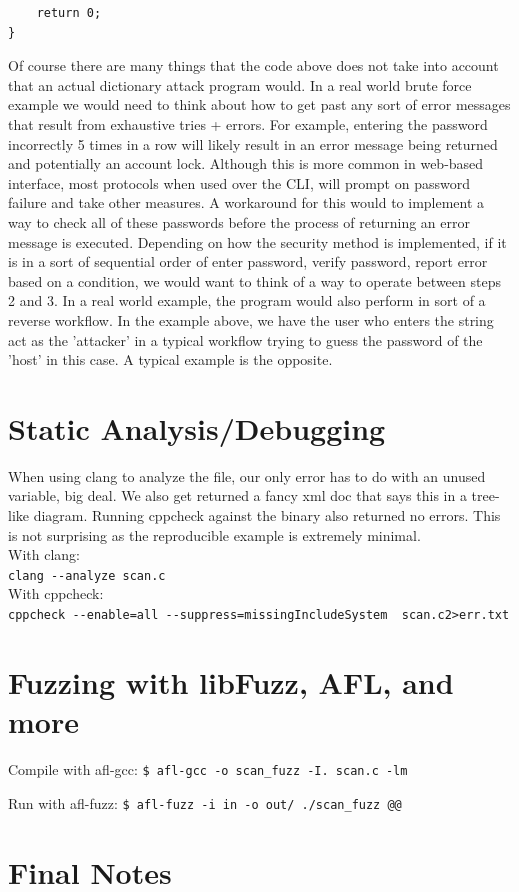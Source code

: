 \documentclass[12pt, letterpaper]{article}
\begin{document}
\begin{sloppypar}
\begin{flushleft}
\begin{lstlisting}
    return 0;
}
\end{lstlisting}
Of course there are many things that the code above does not take into account that an 
actual dictionary attack program would. In a real world brute force example we would need
to think about how to get past any sort of error messages that result from exhaustive 
tries + errors. For example, entering the password incorrectly 5 times in a row will likely 
result in an error message being returned and potentially an account lock. Although this is 
more common in web-based interface, most protocols when used over the CLI, will prompt on 
password failure and take other measures. A workaround for this would to implement a way to
check all of these passwords before the process of returning an error message is executed. 
Depending on how the security method is implemented, if it is in a sort of sequential order
of enter password, verify password, report error based on a condition, we would want to think
of a way to operate between steps 2 and 3. In a real world example, the program would also 
perform in sort of a reverse workflow. In the example above, we have the user who enters the
string act as the 'attacker' in a typical workflow trying to guess the password of the 
'host' in this case. A typical example is the opposite. 

\section*{Static Analysis/Debugging}
When using clang to analyze the file, our only error has to do with an unused variable, 
big deal. We also get returned a fancy xml doc that says this in a tree-like diagram. 
Running cppcheck against the binary also returned no errors. This is not surprising as the
reproducible example is extremely minimal. \\

With clang: \\
\verb|clang --analyze scan.c| \\

With cppcheck: \\
\verb|cppcheck --enable=all --suppress=missingIncludeSystem  scan.c2>err.txt | \\

\section*{Fuzzing with libFuzz, AFL, and more}

Compile with afl-gcc:
\verb|$ afl-gcc -o scan_fuzz -I. scan.c -lm|

Run with afl-fuzz:
\verb|$ afl-fuzz -i in -o out/ ./scan_fuzz @@ |

\section*{Final Notes}


\end{flushleft}
\end{sloppypar}
\end{document}
